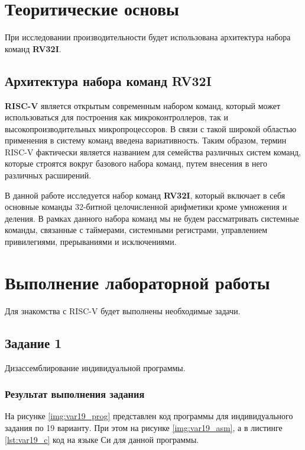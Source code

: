 \chapter{Теоритические основы}
При исследовании производительности будет использована архитектура набора команд \textbf{RV32I}. 

\section{Архитектура набора команд RV32I}

\textbf{RISC-V} является открытым современным набором команд, который может использоваться для построения как микроконтроллеров, так и высокопроизводительных микропроцессоров. В связи с такой широкой областью применения в систему команд введена вариативность. Таким образом, термин RISC-V фактически является названием для семейства различных систем команд, которые строятся вокруг базового набора команд, путем внесения в него различных расширений.

В данной работе исследуется набор команд \textbf{RV32I}, который включает в себя основные
команды 32-битной целочисленной арифметики кроме умножения и деления. В рамках
данного набора команд мы не будем рассматривать системные команды, связанные с
таймерами, системными регистрами, управлением привилегиями, прерываниями и исключениями.


\chapter{Выполнение лабораторной работы}

Для знакомства с RISC-V будет выполнены необходимые задачи.

\section{Задание 1}

Дизассемблирование индивидуальной программы.

\subsection{Результат выполнения задания}

На рисунке \ref{img:var19_prog} представлен код программы для индивидуального задания по 19 варианту. При этом на рисунке \ref{img:var19_asm}, а в листинге \ref{lst:var19_c} код на языке Си для данной программы. 


